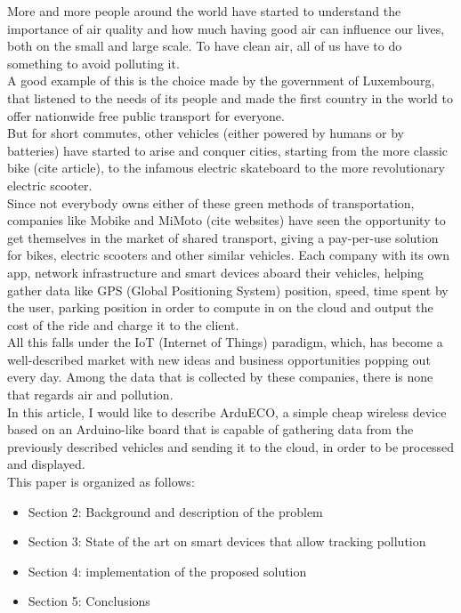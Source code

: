 \documentclass[conference]{IEEEtran}
\begin{document}
	More and more people around the world have started to understand the importance of air quality and how much having good air can influence our lives, both on the small and large scale. 
	To have clean air, all of us have to do something to avoid polluting it. \\
	A good example of this is the choice made by the government of Luxembourg, that listened to the needs of its people and made the first country in the world to offer nationwide free public transport for everyone.\\
	But for short commutes, other vehicles (either powered by humans or by batteries) have started to arise and conquer cities, starting from the more classic bike (cite article), to the infamous electric skateboard to the more revolutionary electric scooter.\\
	Since not everybody owns either of these green methods of transportation, companies like Mobike and MiMoto (cite websites) have seen the opportunity to get themselves in the market of shared transport, giving a pay-per-use solution for bikes, electric scooters and other similar vehicles.
	Each company with its own app, network infrastructure and smart devices aboard their vehicles, helping gather data like GPS (Global Positioning System) position, speed, time spent by the user, parking position in order to compute in on the cloud and output the cost of the ride and charge it to the client.\\
	All this falls under the IoT (Internet of Things) paradigm, which, has become a well-described market with new ideas and business opportunities popping out every day.
	Among the data that is collected by these companies, there is none that regards air and pollution.\\
	In this article, I would like to describe ArduECO, a simple cheap wireless device based on an Arduino-like board that is capable of gathering data from the previously described vehicles and sending it to the cloud, in order to be processed and displayed.\\
	This paper is organized as follows:
	\begin{itemize}
		\item Section 2: Background and description of the problem
		\item Section 3: State of the art on smart devices that allow tracking pollution
		\item Section 4: implementation of the proposed solution
		\item Section 5: Conclusions
	\end{itemize}
\end{document}
